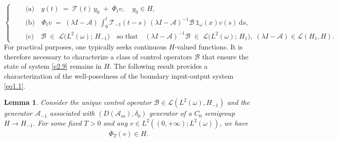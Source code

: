 \documentclass[10pt, a4]{amsart}
\theoremstyle{plain}
\newtheorem{lemma}{Lemma}[section]
\theoremstyle{definition}
\theoremstyle{remark}
\numberwithin{equation}{section}
\begin{document}
\begin{equation*}
\left\lbrace 
\begin{array}{ll}
&\quad \text{(a)}\quad y(t) \;=\; \mathcal{T}(t)\,y_0 \;+\; \Phi_tv, \quad y_0 \in H, \\
&\quad \text{(b)}\quad \Phi_tv \;=\; (\lambda I-\mathcal{A})\,\displaystyle\int_0^t \mathcal{T}_{-1}(t-s)\,(\lambda I-\mathcal{A})^{-1} \mathcal{B}\,\mathds{1}_{\omega}(x)v(s)\,\mathrm{d}s, \\
&\quad \text{(c)}\quad \mathcal{B} \;\in\; \mathcal{L}\bigl(L^2(\omega);\,H_{-1}\bigr)
\quad \text{so that} \quad (\lambda I-\mathcal{A})^{-1} \mathcal{B} \;\in\; \mathcal{L}\bigl(L^2(\omega);\,H_1\bigr),\; (\lambda I-\mathcal{A}) \in \mathcal{L}(H_1, H).
\end{array}
\right.
\end{equation*}
For practical purposes, one typically seeks continuous \(H\)-valued functions. It is therefore necessary to characterize a class of control operators \(\mathcal{B}\) that ensure the state of system  \eqref{e2.9} remains in \(H\). The following result provides a characterization of the well-posedness of the boundary input-output system \eqref{eq1.1}.
\begin{lemma}\label{l2.5}
Consider the unique control operator $\mathcal{B}\in \mathcal{L}(L^2(\omega), H_{-1})$ and the generator \(\mathcal{A}_{-1}\) associated with \((D(\mathcal{A}_m), \delta_0)\) generator of a \(C_0\) semigroup \(H\longrightarrow H_{-1}\). For some fixed \(T>0\) and any \(v \in L^2((0,+\infty); L^2(\omega))\), we have
\begin{align}\label{e2.12}
    \Phi_T(v) \in H.
\end{align} 
\end{lemma}
\end{document}
